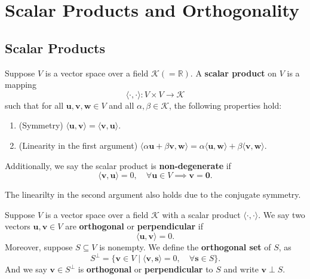 \documentclass{ctexart}
\begin{document}
	\newpage
	\section{Scalar Products and Orthogonality}


	\subsection{Scalar Products}
	\begin{mydef}
		Suppose $V$ is a vector space over a field $\mathcal{K}(=\mathbb{R})$. A \textbf{scalar product} on $V$ is a mapping
		\[
		\langle \cdot, \cdot \rangle : V \times V \to \mathcal{K}
		\]
		such that for all $\mathbf{u}, \mathbf{v}, \mathbf{w} \in V$ and all $\alpha, \beta \in \mathcal{K}$, the following properties hold:
		\begin{enumerate}
			\item (Symmetry) $\langle \mathbf{u}, \mathbf{v} \rangle = \langle \mathbf{v}, \mathbf{u} \rangle$.
			\item (Linearity in the first argument) $\langle \alpha \mathbf{u} + \beta \mathbf{v}, \mathbf{w} \rangle = \alpha \langle \mathbf{u}, \mathbf{w} \rangle + \beta \langle \mathbf{v}, \mathbf{w} \rangle$.
		\end{enumerate}
		Additionally, we say the scalar product is \textbf{non-degenerate} if
		\[
		\langle \mathbf{v}, \mathbf{u} \rangle = 0, \quad \forall \mathbf{u} \in V \implies \mathbf{v} = \mathbf{0}.
		\]
	\end{mydef}
	\begin{myrmk}
		The linearilty in the second argument also holds due to the conjugate symmetry.
	\end{myrmk}
	\begin{mydef}
		Suppose $V$ is a vector space over a field $\mathcal{K}$ with a scalar product $\langle \cdot, \cdot \rangle$. We say two vectors $\mathbf{u}, \mathbf{v} \in V$ are \textbf{orthogonal} or \textbf{perpendicular} if
		\[
		\langle \mathbf{u}, \mathbf{v} \rangle = 0.
		\]
		Moreover, suppose $S \subseteq V$ is nonempty. We define the \textbf{orthogonal set} of $S$, as
		\[
		S^\perp = \{ \mathbf{v} \in V \mid \langle \mathbf{v}, \mathbf{s} \rangle = 0, \quad \forall \mathbf{s} \in S \}.
		\]
		And we say $\mathbf{v}\in S^\perp$ is \textbf{orthogonal} or \textbf{perpendicular} to $S$ and write $\mathbf{v} \perp S$.
	\end{mydef}
\end{document}

